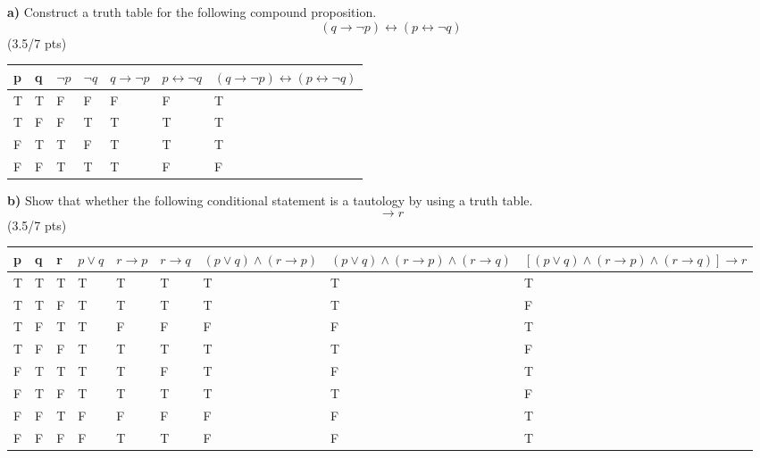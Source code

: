 \documentclass[a4paper,12pt]{article}
\newcommand\tab[1][1cm]{\hspace*{#1}}
\begin{document}
\tab \textbf{a)} Construct a truth table for the following compound proposition.
\begin{equation*}
    (q \rightarrow \neg p)\leftrightarrow (p \leftrightarrow \neg q)
\end{equation*} 
\hfill \small{(3.5/7 pts)} \\
\begin{tcolorbox}
\begin{tabular}{ | m{1 cm} | m{1cm}| m{1cm} | m{1cm} | m{2cm} | m{2cm} | m{4cm} | } 
 \hline
 p & q & $\neg p$ & $\neg q$ & $q \rightarrow \neg p$ & $p \leftrightarrow \neg q$ & $(q \rightarrow \neg p) \leftrightarrow (p \leftrightarrow \neg q)$ \\
 \hline
 T & T & F & F & F & F & T  \\
\hline
 T & F & F & T & T & T & T  \\
 \hline
 F & T & T & F & T & T & T  \\
 \hline
 F & F & T & T & T & F & F  \\
 \hline
\end{tabular}
\end{tcolorbox}
\newpage
\tab \textbf{b)} Show that whether the following conditional statement is a tautology by using a truth table.
\begin{equation*}
    [(p \vee q) \wedge (r \rightarrow p) \wedge (r \rightarrow q)] \rightarrow r
\end{equation*}
\hfill \small{(3.5/7 pts)}\\
\begin{tcolorbox}
\begin{tabular}{ | m{0.2 cm} | m{0.2cm}| m{0.2cm} | m{0.8cm} | m{1cm} | m{1cm} | m{2cm} | m{3cm} | m{3cm} |} 
 \hline
 p & q & r & $p \vee q$ & $r \rightarrow p$ & $r \rightarrow q$ & $(p \vee q) \wedge (r \rightarrow p)$ & $(p \vee q) \wedge (r \rightarrow p) \wedge (r \rightarrow q)$ & $[(p \vee q) \wedge (r \rightarrow p) \wedge (r \rightarrow q)] \rightarrow r$\\
 \hline
 T & T & T & T & T & T & T & T & T\\
 \hline
 T & T & F & T & T & T & T & T & F\\
 \hline
 T & F & T & T & F & F & F & F & T\\
 \hline
 T & F & F & T & T & T & T & T & F\\
 \hline
 F & T & T & T & T & F & T & F & T\\
 \hline
 F & T & F & T & T & T & T & T & F\\
 \hline
 F & F & T & F & F & F & F & F & T\\
 \hline
 F & F & F & F & T & T & F & F & T\\
 \hline

\end{tabular}
\end{tcolorbox}
\end{document}
